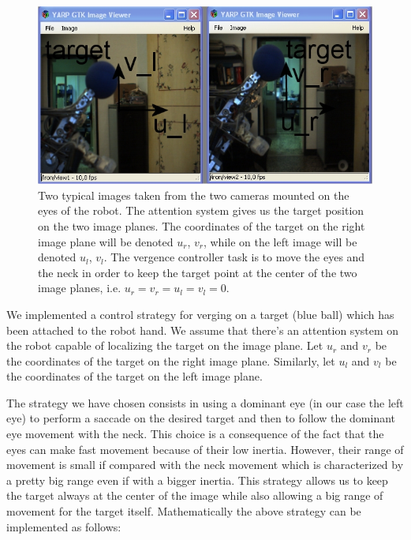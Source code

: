 \begin{figure}[tbp]
\centering
\includegraphics[width=120mm]{Figure/SteroImages.jpg}
\caption{Two typical images taken from the two cameras mounted on the eyes of the robot. The attention system gives us the target position on the two image planes. The coordinates of the target on the right image plane will be denoted $u_r$, $v_r$, while on the left image will be denoted $u_l$, $v_l$. The vergence controller task is to move the eyes and the neck in order to keep the target point at the center of the two image planes, i.e. $u_r = v_r = u_l = v_l = 0$.}
\label{Fig:ImagePlane}
\end{figure}

We implemented a control strategy for verging on a target (blue ball) which has been attached to the robot hand. We assume that there's an attention system on the robot capable of localizing the target on the image plane. Let $u_r$ and $v_r$ be the coordinates of the target on the right image plane. Similarly, let $u_l$ and $v_l$ be the coordinates of the target on the left image plane. 

The strategy we have chosen consists in using a dominant eye (in our case the left eye) to perform a saccade on the desired target and then to follow the dominant eye movement with the neck. This choice is a consequence of the fact that the eyes can make fast movement because of their low inertia. However, their range of movement is small if compared with the neck movement which is characterized by a pretty big range even if with a bigger inertia. This strategy allows us to keep the target always at the center of the image while also allowing a big range of movement for the target itself. Mathematically the above strategy can be implemented as follows:

